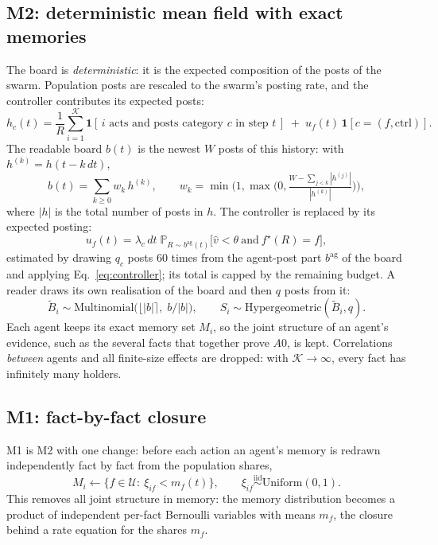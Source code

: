 \documentclass[10pt,a4paper]{article}
\newcommand{\Prob}{\mathbb{P}}
\newcommand{\U}{\mathcal{U}}
\newcommand{\ind}{\mathbf{1}}
\begin{document}
\subsection{M2: deterministic mean field with exact memories}
The board is \emph{deterministic}: it is the expected composition of the posts of the swarm. Population posts are
rescaled to the swarm's posting rate, and the controller contributes its expected posts:
\begin{equation}
  h_c(t)=\frac{1}{R}\sum_{i=1}^{\mathcal{K}}\ind[\,i\text{ acts and posts category }c\text{ in step }t\,]
        \;+\;u_f(t)\,\ind[c=(f,\text{ctrl})].\label{eq:h}
\end{equation}
The readable board $b(t)$ is the newest $W$ posts of this history: with $h^{(k)}=h(t-k\,dt)$,
\begin{equation}
  b(t)=\sum_{k\ge0}w_k\,h^{(k)},\qquad
  w_k=\min\!\Big(1,\max\!\Big(0,\tfrac{W-\sum_{j<k}|h^{(j)}|}{|h^{(k)}|}\Big)\Big),\label{eq:window}
\end{equation}
where $|h|$ is the total number of posts in $h$. The controller is replaced by its expected posting:
\begin{equation}
  u_f(t)=\lambda_c\,dt\;\Prob_{R\sim b^{\text{ag}}(t)}\!\big[\hat v<\theta\ \text{and}\ f^\star(R)=f\big],\label{eq:u}
\end{equation}
estimated by drawing $q_c$ posts 60 times from the agent-post part $b^{\text{ag}}$ of the board and applying
Eq.~\eqref{eq:controller}; its total is capped by the remaining budget. A reader draws its own realisation of the board
and then $q$ posts from it:
\begin{equation}
  \tilde B_i\sim\mathrm{Multinomial}\big(\lfloor|b|\rceil,\;b/|b|\big),\qquad S_i\sim\mathrm{Hypergeometric}(\tilde B_i,q).\label{eq:mfread}
\end{equation}
Each agent keeps its exact memory set $M_i$, so the joint structure of an agent's evidence, such as the several facts
that together prove $A0$, is kept. Correlations \emph{between} agents and all finite-size effects are dropped: with
$\mathcal{K}\to\infty$, every fact has infinitely many holders.

\subsection{M1: fact-by-fact closure}
M1 is M2 with one change: before each action an agent's memory is redrawn independently fact by fact from the
population shares,
\begin{equation}
  M_i\leftarrow\{f\in\U:\ \xi_{if}<m_f(t)\},\qquad \xi_{if}\overset{\text{iid}}{\sim}\mathrm{Uniform}(0,1).\label{eq:m1}
\end{equation}
This removes all joint structure in memory: the memory distribution becomes a product of independent per-fact
Bernoulli variables with means $m_f$, the closure behind a rate equation for the shares $m_f$.
\end{document}
